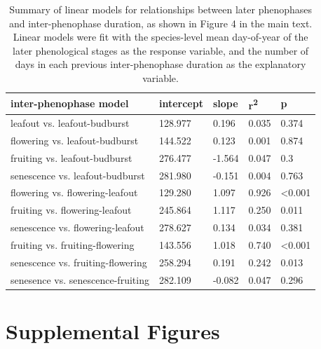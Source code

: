 \documentclass{article}
\begin{document}
\begin{table}[ht]
\centering
\caption{Summary of linear models for relationships between later phenophases and inter-phenophase duration, as shown in Figure 4 in the main text. Linear models were fit with the species-level mean day-of-year of the later phenological stages as the response variable, and the number of days in each previous inter-phenophase duration as the explanatory variable.} 
\label{table:interphase}
\begin{tabular}{|p{}|p{}|p{}|p{}|p{}|}
  \hline
inter-phenophase model & intercept & slope & r\textsuperscript{2} & p \\ 
  \hline
leafout vs. leafout-budburst & 128.977 & 0.196 & 0.035 & 0.374 \\ 
  flowering vs. leafout-budburst & 144.522 & 0.123 & 0.001 & 0.874 \\ 
  fruiting vs. leafout-budburst & 276.477 & -1.564 & 0.047 & 0.3 \\ 
  senescence vs. leafout-budburst & 281.980 & -0.151 & 0.004 & 0.763 \\ 
  flowering vs. flowering-leafout & 129.280 & 1.097 & 0.926 & <0.001 \\ 
  fruiting vs. flowering-leafout & 245.864 & 1.117 & 0.250 & 0.011 \\ 
  senescence vs. flowering-leafout & 278.627 & 0.134 & 0.034 & 0.381 \\ 
  fruiting vs. fruiting-flowering & 143.556 & 1.018 & 0.740 & <0.001 \\ 
  senescence vs. fruiting-flowering & 258.294 & 0.191 & 0.242 & 0.013 \\ 
  senesence vs. senescence-fruiting & 282.109 & -0.082 & 0.047 & 0.296 \\ 
   \hline
\end{tabular}
\end{table}\clearpage

\section* {Supplemental Figures}
\end{document}
